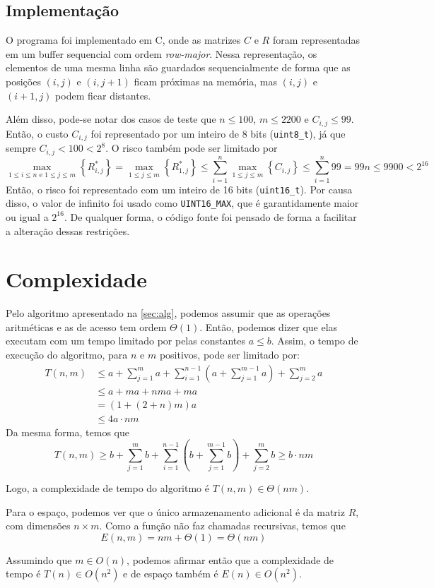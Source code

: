 \subsection{Implementação}

O programa foi implementado em C, onde as matrizes $C$ e $R$ foram representadas em um buffer sequencial com ordem \textit{row-major}. Nessa representação, os elementos de uma mesma linha são guardados sequencialmente de forma que as posições $(i, j)$ e $(i, j + 1)$ ficam próximas na memória, mas $(i, j)$ e $(i + 1, j)$ podem ficar distantes.

Além disso, pode-se notar dos casos de teste que $n \leq 100$, $m \leq 2200$ e $C_{i, j} \leq 99$. Então, o custo $C_{i, j}$ foi representado por um inteiro de 8 bits (\texttt{uint8\_t}), já que sempre $C_{i, j} < 100 < 2^8$. O risco também pode ser limitado por
\[
    \max_{1 \leq i \leq n \text{~e~} 1 \leq j \leq m} \left\{R^*_{i, j}\right\} = \max_{1 \leq j \leq m} \left\{R^*_{1, j}\right\} \leq \sum_{i = 1}^n \max_{1 \leq j \leq m}\left\{C_{i, j}\right\} \leq \sum_{i = 1}^n 99 = 99 n \leq 9900 < 2^{16}
\]
Então, o risco foi representado com um inteiro de 16 bits (\texttt{uint16\_t}). Por causa disso, o valor de infinito foi usado como \texttt{UINT16_MAX}, que é garantidamente maior ou igual a $2^{16}$. De qualquer forma, o código fonte foi pensado de forma a facilitar a alteração dessas restrições.

\section{Complexidade}

Pelo algoritmo apresentado na \cref{sec:alg}, podemos assumir que as operações aritméticas e as de acesso tem ordem $\Theta(1)$. Então, podemos dizer que elas executam com um tempo limitado por pelas constantes $a \leq b$. Assim, o tempo de execução do algoritmo, para $n$ e $m$ positivos, pode ser limitado por:
\begin{align*}
    T(n, m) &\leq a + \sum_{j = 1}^m a + \sum_{i = 1}^{n - 1} \left( a + \sum_{j = 1}^{m - 1} a \right) + \sum_{j = 2}^m a \\
    &\leq a + m a + n m a + m a \\
    &= (1 + (2 + n) m) a \\
    &\leq 4 a \cdot n m
\end{align*}
Da mesma forma, temos que
\[
    T(n, m) \geq b + \sum_{j = 1}^m b + \sum_{i = 1}^{n - 1} \left( b + \sum_{j = 1}^{m - 1} b \right) + \sum_{j = 2}^m b \geq b \cdot n m
\]

Logo, a complexidade de tempo do algoritmo é $T(n, m) \in \Theta(n m)$.

Para o espaço, podemos ver que o único armazenamento adicional é da matriz $R$, com dimensões $n \times m$. Como a função não faz chamadas recursivas, temos que
\[
    E(n, m) = n m + \Theta(1) = \Theta(n m)
\]

Assumindo que $m \in O(n)$, podemos afirmar então que a complexidade de tempo é $T(n) \in O\left(n^2\right)$ e de espaço também é $E(n) \in O\left(n^2\right)$.
